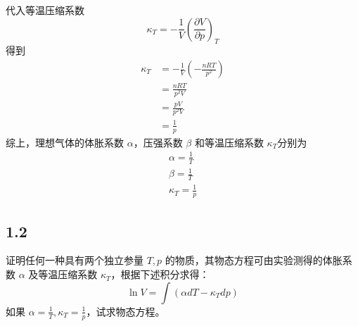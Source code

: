 代入等温压缩系数
\begin{equation}
    \kappa _T=-\frac{1}{V}\left( \frac{\partial V}{\partial p} \right) _T
\end{equation}
得到
\begin{equation}
    \begin{aligned}
        \kappa _T&=-\frac{1}{V}\left( -\frac{nRT}{p^2} \right) 
\\
&=\frac{nRT}{p^2V}
\\
&=\frac{pV}{p^2V}
\\
&=\frac{1}{p}
    \end{aligned}
\end{equation}
综上，理想气体的体胀系数 $\alpha$，压强系数 $\beta$ 和等温压缩系数 $\kappa_T$分别为
\begin{equation}
    \begin{aligned}
        \alpha =\frac{1}{T}
\\
\beta =\frac{1}{T}
\\
\kappa _T=\frac{1}{p}
    \end{aligned}
\end{equation}










\newpage
\subsection{1.2}
证明任何一种具有两个独立参量 $T, p$ 的物质，其物态方程可由实验测得的体胀系数 $\alpha$ 及等温压缩系数 $\kappa_T$，根据下述积分求得：
$$
\ln V = \int (\alpha dT - \kappa_T dp)
$$
如果 $\alpha = \frac{1}{T}, \kappa_T = \frac{1}{p}$，试求物态方程。

